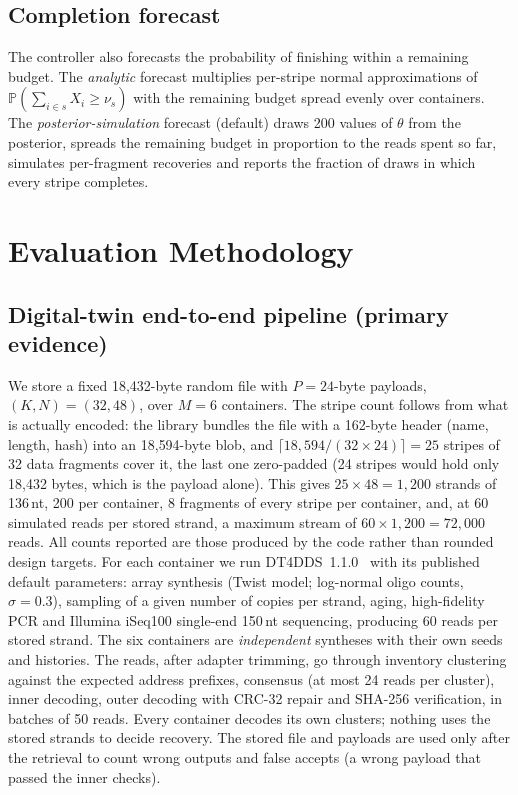 \documentclass[conference,onecolumn,11pt]{IEEEtran}
\newcommand{\Prob}{\mathbb{P}}
\begin{document}
\subsection{Completion forecast}
The controller also forecasts the probability of finishing within a remaining budget.  The
\emph{analytic} forecast multiplies per-stripe normal approximations of
$\Prob(\sum_{i\in s}X_i\ge\nu_s)$ with the remaining budget spread evenly over containers.  The
\emph{posterior-simulation} forecast (default) draws 200 values of $\theta$ from the posterior,
spreads the remaining budget in proportion to the reads spent so far, simulates per-fragment
recoveries and reports the fraction of draws in which every stripe completes.

\section{Evaluation Methodology}\label{sec:eval}
\subsection{Digital-twin end-to-end pipeline (primary evidence)}
We store a fixed 18{,}432-byte random file with $P{=}24$-byte payloads, $(K,N)=(32,48)$, over
$M{=}6$ containers.  The stripe count follows from what is actually encoded: the library bundles the
file with a 162-byte header (name, length, hash) into an 18{,}594-byte blob, and
$\lceil 18{,}594/(32\times24)\rceil=25$ stripes of 32 data fragments cover it, the last one
zero-padded (24 stripes would hold only 18{,}432 bytes, which is the payload alone).  This gives
$25\times48=1{,}200$ strands of 136\,nt, 200 per container, 8 fragments of every stripe per container,
and, at 60 simulated reads per stored strand, a maximum stream of $60\times1{,}200=72{,}000$ reads.
All counts reported are those produced by the code rather than rounded design targets.  For each
container we run
DT4DDS~1.1.0~\cite{gimpel2023digital} with its published default parameters: array synthesis
(Twist model; log-normal oligo counts, $\sigma{=}0.3$), sampling of a given number of copies
per strand, aging, high-fidelity PCR and Illumina iSeq100 single-end 150\,nt sequencing,
producing 60 reads per stored strand.  The six containers are \emph{independent} syntheses with
their own seeds and histories.  The reads, after adapter trimming, go through inventory
clustering against the expected address prefixes, consensus (at most 24 reads per cluster),
inner decoding, outer decoding with CRC-32 repair and SHA-256 verification, in batches of 50
reads.  Every container decodes its own clusters; nothing uses the stored strands to decide
recovery.  The stored file and payloads are used only after the retrieval to count wrong
outputs and false accepts (a wrong payload that passed the inner checks).
\end{document}
